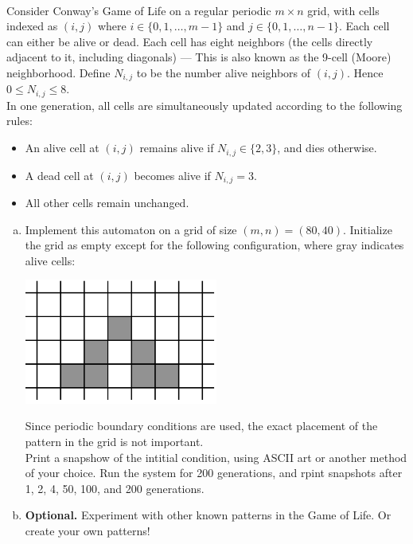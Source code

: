 \documentclass{article}
\begin{document}
\begin{problem} \\ 
    Consider Conway's Game of Life on a regular periodic $m \times n$ grid, with cells indexed as $(i,j)$ where $i \in \{ 0, 1, \dots, m-1 \}$ and $j \in \{ 0, 1, \dots, n-1 \}$. Each cell can either be alive or dead. Each cell has eight neighbors (the cells directly adjacent to it, including diagonals) --- This is also known as the 9-cell (Moore) neighborhood. Define $N_{i,j}$ to be the number alive neighbors of $(i,j)$. Hence $0 \leq N_{i,j} \leq 8$. \\
    In one generation, all cells are simultaneously updated according to the following rules:
    \begin{itemize}
        \item An alive cell at $(i,j)$ remains alive if $N_{i,j} \in \{ 2, 3 \}$, and dies otherwise.
        \item A dead cell at $(i,j)$ becomes alive if $N_{i,j} = 3$.
        \item All other cells remain unchanged.
    \end{itemize}

    \begin{enumerate}[a)]
        \item Implement this automaton on a grid of size $(m,n) = (80,40)$. Initialize the grid as empty except for the following configuration, where gray indicates alive cells:
        \begin{center}
            \includegraphics[width=0.5\textwidth]{OpHw1_3aQ.png}
        \end{center}
        Since periodic boundary conditions are used, the exact placement of the pattern in the grid is not important. \\
        Print a snapshow of the intitial condition, using ASCII art or another method of your choice. Run the system for 200 generations, and rpint snapshots after 1, 2, 4, 50, 100, and 200 generations.
        \item \textbf{Optional.} Experiment with other known patterns in the Game of Life. Or create your own patterns!
    \end{enumerate}
\end{problem}
\end{document}
